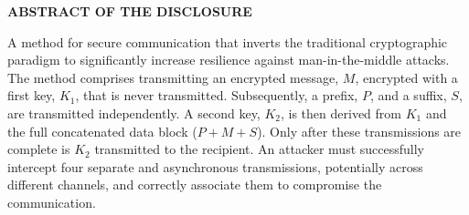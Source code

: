 \documentclass[11pt,letterpaper]{article}
\begin{document}
\thispagestyle{empty}

\begin{center}
    \textbf{\large ABSTRACT OF THE DISCLOSURE}
\end{center}

\vspace{0.6cm}

A method for secure communication that inverts the traditional cryptographic paradigm to significantly increase resilience against man-in-the-middle attacks. The method comprises transmitting an encrypted message, $M$, encrypted with a first key, $K_1$, that is never transmitted. Subsequently, a prefix, $P$, and a suffix, $S$, are transmitted independently. A second key, $K_2$, is then derived from $K_1$ and the full concatenated data block ($P+M+S$). Only after these transmissions are complete is $K_2$ transmitted to the recipient. An attacker must successfully intercept four separate and asynchronous transmissions, potentially across different channels, and correctly associate them to compromise the communication.
\end{document}
